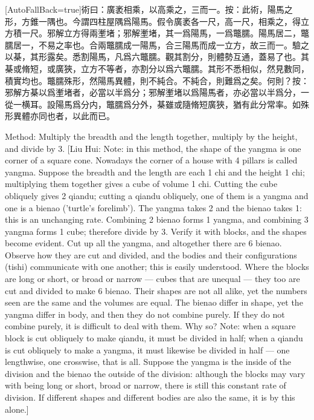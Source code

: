 \documentclass[11pt]{article}
\newcommand{\zhsmall}{\footnotesize\color{black!70}}
\newcommand{\unitlabel}[1]{\marginpar{\raggedleft\tiny\color{gray}#1}}
\newenvironment{unitzh}{\par\CJKfontspec{Noto Serif CJK SC}[AutoFallBack=true]\large\linespread{1.25}\selectfont}{\par}
\newenvironment{uniten}{\par\small\color{black!85}}{\par\medskip}
\begin{document}
\begin{unitzh}\unitlabel{jiuzhang-019.11}術曰：廣袤相乘，以高乘之，三而一。{\zhsmall 按：此術，陽馬之形，方錐一隅也。今謂四柱屋隅爲陽馬。假令廣袤各一尺，高一尺，相乘之，得立方積一尺。邪解立方得兩壍堵；邪解壍堵，其一爲陽馬，一爲鼈臑。陽馬居二，鼈臑居一，不易之率也。合兩鼈臑成一陽馬，合三陽馬而成一立方，故三而一。驗之以棊，其形露矣。悉割陽馬，凡爲六鼈臑。觀其割分，則體勢互通，蓋易了也。其棊或脩短，或廣狹，立方不等者，亦割分以爲六鼈臑。其形不悉相似，然見數同，積實均也。鼈臑殊形，然陽馬異體，則不純合。不純合，則難爲之矣。何則？按：邪解方棊以爲壍堵者，必當以半爲分；邪解壍堵以爲陽馬者，亦必當以半爲分，一從一横耳。設陽馬爲分内，鼈臑爲分外，棊雖或隨脩短廣狹，猶有此分常率。如殊形異體亦同也者，以此而已。}\end{unitzh}
\begin{uniten}Method: Multiply the breadth and the length together, multiply by the height, and divide by 3. [Liu Hui: Note: in this method, the shape of the yangma is one corner of a square cone. Nowadays the corner of a house with 4 pillars is called yangma. Suppose the breadth and the length are each 1 chi and the height 1 chi; multiplying them together gives a cube of volume 1 chi. Cutting the cube obliquely gives 2 qiandu; cutting a qiandu obliquely, one of them is a yangma and one is a bienao ('turtle's forelimb'). The yangma takes 2 and the bienao takes 1: this is an unchanging rate. Combining 2 bienao forms 1 yangma, and combining 3 yangma forms 1 cube; therefore divide by 3. Verify it with blocks, and the shapes become evident. Cut up all the yangma, and altogether there are 6 bienao. Observe how they are cut and divided, and the bodies and their configurations (tishi) communicate with one another; this is easily understood. Where the blocks are long or short, or broad or narrow — cubes that are unequal — they too are cut and divided to make 6 bienao. Their shapes are not all alike, yet the numbers seen are the same and the volumes are equal. The bienao differ in shape, yet the yangma differ in body, and then they do not combine purely. If they do not combine purely, it is difficult to deal with them. Why so? Note: when a square block is cut obliquely to make qiandu, it must be divided in half; when a qiandu is cut obliquely to make a yangma, it must likewise be divided in half — one lengthwise, one crosswise, that is all. Suppose the yangma is the inside of the division and the bienao the outside of the division: although the blocks may vary with being long or short, broad or narrow, there is still this constant rate of division. If different shapes and different bodies are also the same, it is by this alone.]\end{uniten}
\end{document}
